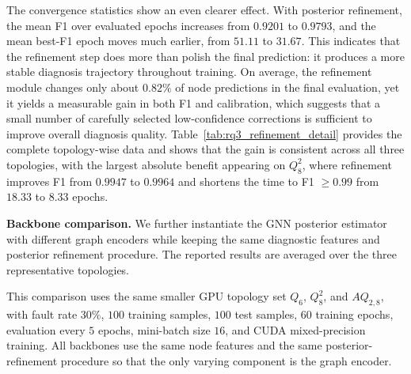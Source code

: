The convergence statistics show an even clearer effect. With posterior refinement, the mean F1 over evaluated epochs increases from $0.9201$ to $0.9793$, and the mean best-F1 epoch moves much earlier, from $51.11$ to $31.67$. This indicates that the refinement step does more than polish the final prediction: it produces a more stable diagnosis trajectory throughout training. On average, the refinement module changes only about $0.82\%$ of node predictions in the final evaluation, yet it yields a measurable gain in both F1 and calibration, which suggests that a small number of carefully selected low-confidence corrections is sufficient to improve overall diagnosis quality. Table~\ref{tab:rq3_refinement_detail} provides the complete topology-wise data and shows that the gain is consistent across all three topologies, with the largest absolute benefit appearing on $Q_8^2$, where refinement improves F1 from $0.9947$ to $0.9964$ and shortens the time to F1 $\geq 0.99$ from $18.33$ to $8.33$ epochs.

\noindent\textbf{Backbone comparison.}
We further instantiate the GNN posterior estimator with different graph encoders while keeping the same diagnostic features and posterior refinement procedure. The reported results are averaged over the three representative topologies.

This comparison uses the same smaller GPU topology set $Q_6$, $Q_8^2$, and $AQ_{2,8}$, with fault rate $30\%$, $100$ training samples, $100$ test samples, $60$ training epochs, evaluation every $5$ epochs, mini-batch size $16$, and CUDA mixed-precision training. All backbones use the same node features and the same posterior-refinement procedure so that the only varying component is the graph encoder.

\begin{table}[h]
\centering
\caption{Comparison of different GNN backbones.}
\label{tab:rq3_backbone}
\vspace{1mm}
\end{table}

